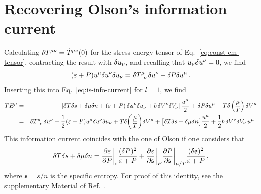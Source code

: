 \documentclass[
a4paper,
amsfonts,
amsmath,
reprint,
showkeys,
nofootinbib,
twoside,
onecolumn,
notitlepage
]{revtex4-1}
\begin{document}
	\section{Recovering Olson's information current}\label{app:olson-ic}
	
	
	Calculating $\delta {T}^{\mu\nu}= \dot{T}^{\mu\nu}(0)$ for the stress-energy tensor of Eq.\ \eqref{eq:const-em-tensor}, contracting the result with $\delta u_\nu$, and recalling that $u_\nu \delta u^\nu  = 0$, we find
	\begin{equation}
		(\ed+P)u^\mu\delta u^\nu \delta u_\nu =
		\delta T\indices{^\mu _\nu}\delta u^\nu - \delta P \delta u^\mu  \, . 
	\end{equation}
	Inserting this into Eq.\ \eqref{eq:is-info-current} for $l=1$, we find 
	\begin{eqnarray}
		TE^\mu &=& \left[ \d T \d s +\d \mu \d n +\left(\ed+P\right)\d u^\nu \d u_\nu + b \, \d V^\nu \d V_{\nu} \right]\dfrac{u^\mu}{2} + \delta P\delta u^\mu +T\delta \left(\dfrac{\mu}{T} \right)\delta V^\mu \\\nonumber
		&=& \delta T\indices{^\mu _\nu}\delta u^\nu -\dfrac{1}{2}(\ed+P)u^\mu \delta u^\nu \delta u_\nu +T\delta \bigg(\dfrac{\mu}{T} \bigg)\delta V^\mu+\big[ \delta T \delta s +\delta \mu \delta n\big]\dfrac{u^\mu}{2}+\dfrac{1}{2}  b \, \delta V^\nu \delta V_{\nu} \, u^\mu \,. 
	\end{eqnarray}
	This information current coincides with the one of Olson \cite{OlsonLifsh1990} if one considers that
	\begin{equation}
		\delta T \delta s +\delta \mu \delta n =\dfrac{\partial \varepsilon}{\partial P}\bigg|_{\mathfrak{s}} \dfrac{(\delta P)^2}{\varepsilon+P} +\dfrac{\partial \varepsilon}{\partial \mathfrak{s}}\bigg|_{P} \dfrac{\partial P}{\partial \mathfrak{s}}\bigg|_{\mu/T} \dfrac{(\delta \mathfrak{s})^2}{\varepsilon+P} \, ,
	\end{equation}
	where $\mathfrak{s}=s/n$ is the specific entropy. 
	For proof of this identity, see the supplementary Material of Ref.\ \cite{GavassinoGibbs2021}.
	
\end{document}
